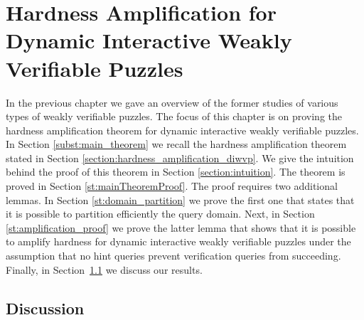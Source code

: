 \documentclass[11pt,a4paper,titlepage]{memoir}
\begin{document}
\chapter{Hardness Amplification for Dynamic Interactive Weakly Verifiable Puzzles}
\label{ch:main_result} %
In the previous chapter we gave an overview of the former studies of various types of weakly verifiable puzzles.
The focus of this chapter is on proving the hardness amplification theorem for dynamic interactive weakly verifiable puzzles.
In Section \ref{subst:main_theorem} we recall the hardness amplification theorem stated in Section \ref{section:hardness_amplification_diwvp}.
We give the intuition behind the proof of this theorem in Section \ref{section:intuition}.
The theorem is proved in Section \ref{st:mainTheoremProof}. The proof requires two additional lemmas.
In Section \ref{st:domain_partition} we prove the first one that states that it is possible to partition efficiently the query domain.
Next, in Section \ref{st:amplification_proof} we prove the latter lemma that shows that it is possible to amplify hardness for dynamic interactive weakly
verifiable puzzles under the assumption that no hint queries prevent verification queries from succeeding.
Finally, in Section~\ref{st:discussion} we discuss our results.
%





%
\section{Discussion}
\label{st:discussion}

%
\appendix

%
\backmatter
%


%
\end{document}
